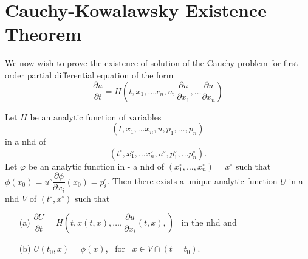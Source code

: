 \section*{Cauchy-Kowalawsky Existence Theorem}\pageoriginale

We now wish to prove the existence of solution of the Cauchy problem for first order partial differential equation of the form
$$
\frac{\partial u}{\partial t}=H\left(t,x_{1},\ldots x_{n},u,\frac{\partial u}{\partial x_{1}},\ldots \frac{\partial u}{\partial x_{n}}\right)
$$

\begin{theorem*}
Let $H$ be an analytic function of variables
$$
(t,x_{1},\ldots x_{n},u,p_{1},\ldots,p_{n})
$$
in a nhd of
$$
(t^{\circ},x^{\circ}_{1},\ldots x^{\circ}_{n},u^{\circ},p^{\circ}_{1},\ldots p^{\circ}_{n}).
$$
Let $\varphi$ be an analytic function in - a nhd of $(x^{\circ}_{1},\ldots,x^{\circ}_{n})=x^{\circ}$ such that $\phi(x_{0})=u^{\circ}\dfrac{\partial \phi}{\partial x_{i}}(x_{0})=p^{\circ}_{i}$. Then there exists a unique analytic function $U$ in a nhd $V$ of $(t^{\circ},x^{\circ})$ such that
\begin{itemize}
\item[\rm(a)] $\dfrac{\partial U}{\partial t}=H(t,x(t,x),\ldots,\dfrac{\partial u}{\partial x_{i}}(t,x),)$ \  in the nhd and

\item[\rm(b)] $U(t_{0},x)=\phi(x)$, \ for \ $x\underline{\in} V\cap (t=t_{0})$.
\end{itemize}
\end{theorem*}

